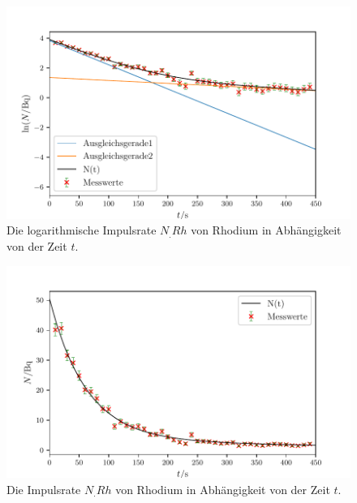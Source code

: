 \begin{table}
	\centering
	
\end{table}

\begin{figure}
	\centering
	\includegraphics[width=\linewidth-50pt,height=\textheight-50pt,keepaspectratio]{content/images/RhodiumLog.pdf}
	\caption{Die logarithmische Impulsrate $N_.{Rh}$ von Rhodium in Abhängigkeit von der Zeit $t$.}
	\label{fig:RhodiumLog}
\end{figure}

\begin{figure}
	\centering
	\includegraphics[width=\linewidth-50pt,height=\textheight-50pt,keepaspectratio]{content/images/Rhodium.pdf}
	\caption{Die Impulsrate $N_.{Rh}$ von Rhodium in Abhängigkeit von der Zeit $t$.}
	\label{fig:Rhodium}
\end{figure}

